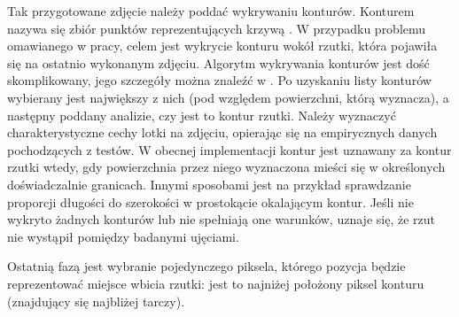 Tak przygotowane zdjęcie należy poddać wykrywaniu konturów. Konturem nazywa się zbiór punktów reprezentujących krzywą \cite{LearningOpenCV}. W przypadku problemu omawianego w pracy, celem jest wykrycie konturu wokół rzutki, która pojawiła się na ostatnio wykonanym zdjęciu. %
Algorytm wykrywania konturów jest dość skomplikowany, jego szczegóły można znaleźć w \cite{ContoursAlgorithm}. Po uzyskaniu listy konturów wybierany jest największy z nich (pod względem powierzchni, którą wyznacza), a następny poddany analizie, czy jest to kontur rzutki. Należy wyznaczyć charakterystyczne cechy lotki na zdjęciu, opierając się na empirycznych danych pochodzących z testów. W obecnej implementacji kontur jest uznawany za kontur rzutki wtedy, gdy powierzchnia przez niego wyznaczona mieści się w określonych doświadczalnie granicach. Innymi sposobami jest na przykład sprawdzanie proporcji długości do szerokości w prostokącie okalającym kontur.  Jeśli nie wykryto żadnych konturów lub nie spełniają one warunków, uznaje się, że rzut nie wystąpił pomiędzy badanymi ujęciami.

Ostatnią fazą jest wybranie pojedynczego piksela, którego pozycja będzie reprezentować miejsce wbicia rzutki: jest to najniżej położony piksel konturu (znajdujący się najbliżej tarczy).